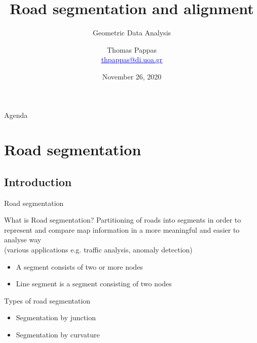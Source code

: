 \documentclass{beamer}
\newcommand{\link}[2]{\href{#1}{\textcolor{blue}{\underline{#2}}}}
\begin{document}
\title{Road segmentation and alignment}
\subtitle{Geometric Data Analysis}
\author{Thomas Pappas\\ \link{mailto:thpappas@di.uoa.gr}{thpappas@di.uoa.gr}}
\date{November 26, 2020}
\maketitle

\begin{frame}{Agenda}
  \tableofcontents[hideallsubsections]
\end{frame}

\section{Road segmentation}

\subsection{Introduction}

\begin{frame}{Road segmentation}
  \begin{block}{What is Road segmentation?}
    Partitioning of roads into segments in order to represent and compare map information in a more meaningful and easier to analyse way\\
    (various applications e.g. traffic analysis, anomaly detection)
    \begin{itemize}
      \item A segment consists of two or more nodes
      \item Line segment is a segment consisting of two nodes
    \end{itemize}
  \end{block}
  
  \begin{block}{Types of road segmentation}
    \begin{itemize}
      \item Segmentation by junction
      \item Segmentation by curvature
    \end{itemize}
  \end{block}
\end{frame}
\end{document}
